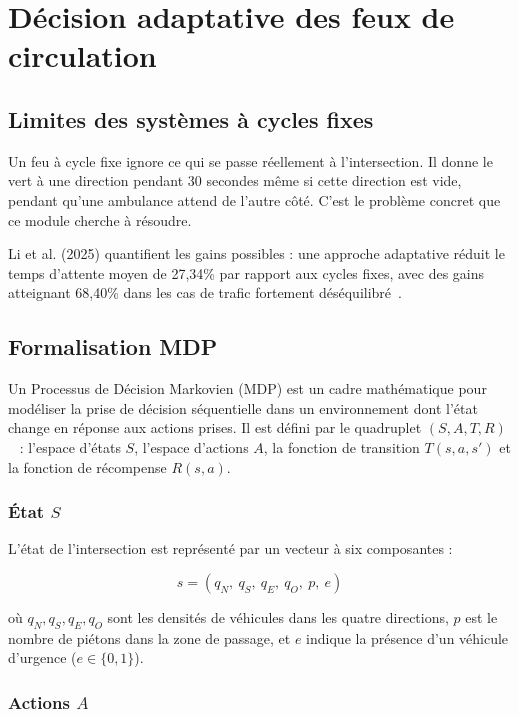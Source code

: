 \section{Décision adaptative des feux de
         circulation}

\subsection{Limites des systèmes à cycles fixes}

Un feu à cycle fixe ignore ce qui se passe
réellement à l'intersection. Il donne le vert
à une direction pendant 30 secondes même si
cette direction est vide, pendant qu'une
ambulance attend de l'autre côté. C'est le
problème concret que ce module cherche à
résoudre.

Li et al. (2025) quantifient les gains
possibles : une approche adaptative réduit
le temps d'attente moyen de 27,34\% par
rapport aux cycles fixes, avec des gains
atteignant 68,40\% dans les cas de trafic
fortement déséquilibré~\cite{li2025}.

\subsection{Formalisation MDP}

Un Processus de Décision Markovien (MDP)
est un cadre mathématique pour modéliser
la prise de décision séquentielle dans un
environnement dont l'état change en réponse
aux actions prises. Il est défini par le
quadruplet $(S, A, T, R)$~\cite{michailidis2025} :
l'espace d'états $S$, l'espace d'actions $A$,
la fonction de transition $T(s,a,s')$ et
la fonction de récompense $R(s,a)$.

\subsubsection{État $S$}

L'état de l'intersection est représenté par
un vecteur à six composantes :

\begin{equation}
s = (q_N,\ q_S,\ q_E,\ q_O,\ p,\ e)
\label{eq:state}
\end{equation}

où $q_N, q_S, q_E, q_O$ sont les densités
de véhicules dans les quatre directions,
$p$ est le nombre de piétons dans la zone
de passage, et $e$ indique la présence
d'un véhicule d'urgence ($e \in \{0,1\}$).

\subsubsection{Actions $A$}

